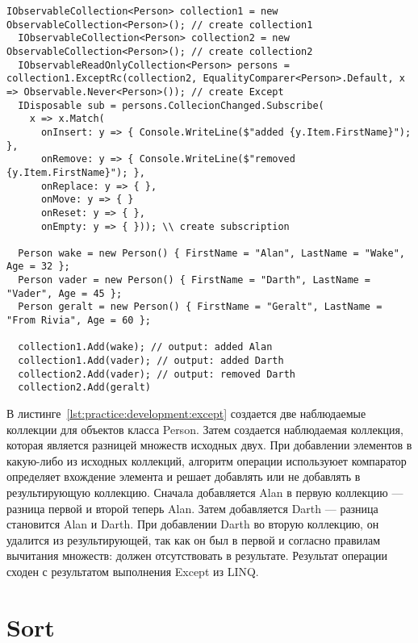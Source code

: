 \begin{lstlisting}[style=csharpinlinestyle, caption={Пример использования Except}, label=lst:practice:development:except]
  IObservableCollection<Person> collection1 = new ObservableCollection<Person>(); // create collection1
  IObservableCollection<Person> collection2 = new ObservableCollection<Person>(); // create collection2
  IObservableReadOnlyCollection<Person> persons = collection1.ExceptRc(collection2, EqualityComparer<Person>.Default, x => Observable.Never<Person>()); // create Except
  IDisposable sub = persons.CollecionChanged.Subscribe(
    x => x.Match(
      onInsert: y => { Console.WriteLine($"added {y.Item.FirstName}"); },
      onRemove: y => { Console.WriteLine($"removed {y.Item.FirstName}"); },
      onReplace: y => { },
      onMove: y => { }
      onReset: y => { },
      onEmpty: y => { })); \\ create subscription

  Person wake = new Person() { FirstName = "Alan", LastName = "Wake", Age = 32 };
  Person vader = new Person() { FirstName = "Darth", LastName = "Vader", Age = 45 };
  Person geralt = new Person() { FirstName = "Geralt", LastName = "From Rivia", Age = 60 };

  collection1.Add(wake); // output: added Alan
  collection1.Add(vader); // output: added Darth
  collection2.Add(vader); // output: removed Darth
  collection2.Add(geralt)
\end{lstlisting}

В листинге~\ref{lst:practice:development:except} создается две наблюдаемые коллекции для объектов класса Person. Затем создается наблюдаемая коллекция, которая является разницей множеств исходных двух.
При добавлении элементов в какую-либо из исходных коллекций, алгоритм операции используюет компаратор определяет вхождение элемента и решает добавлять или не добавлять в результирующую коллекцию.
Сначала добавляется Alan в первую коллекцию --- разница первой и второй теперь Alan. Затем добавляется Darth --- разница становится Alan и Darth.
При добавлении Darth во вторую коллекцию, он удалится из результирующей, так как он был в первой и согласно правилам вычитания множеств: должен отсутствовать в результате.
Результат операции сходен с результатом выполнения Except из LINQ.

\section{Sort}
\label{sub:development:sort}

